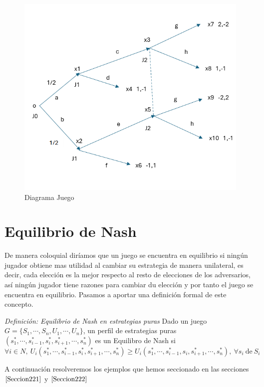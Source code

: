 \documentclass[12pt,a4paper,]{book}
\numberwithin{dummy}{section}
\theoremstyle{ocrenumbox}
\theoremstyle{blacknumex}
\theoremstyle{blacknumbox}
\theoremstyle{ocrenum}
\theoremstyle{ocrenum}
\begin{document}
\begin{figure}[H]

{\centering \includegraphics[width=0.8\linewidth]{forma_extensiva_rigurosa} 

}

\caption{\label{forma_extensiva_rigurosa}Diagrama Juego}\label{fig:forma_extensiva_rigurosa}
\end{figure}

\hypertarget{Seccion23}{%
\section{Equilibrio de Nash}\label{Seccion23}}

De manera coloquial diríamos que un juego se encuentra en equilibrio si
ningún jugador obtiene mas utilidad al cambiar su estrategia de manera
unilateral, es decir, cada elección es la mejor respecto al resto de
elecciones de los adversarios, así ningún jugador tiene razones para
cambiar du elección y por tanto el juego se encuentra en equilibrio.
Pasamos a aportar una definición formal de este concepto.

\emph{Definición: Equilibrio de Nash en estrategias puras} Dado un juego
\(G=\{S_1,\cdots,S_n,U_1,\cdots,U_n\}\), un perfil de estrategias puras
\((s_1^*,\cdots,s_{i-1}^*,s_i^*,s_{i+1}^*,\cdots,s_n^*)\) es un
Equilibro de Nash si \[
\forall i \in N, \ U_i(s_1^*,\cdots,s_{i-1}^*,s_i^*,s_{i+1}^*,\cdots,s_n^*) \geq U_i(s_1^*,\cdots,s_{i-1}^*,s_i,s_{i+1}^*,\cdots,s_n^*), \ \forall s_i \ \text{de} \ S_i
\]

A continuación resolveremos los ejemplos que hemos seccionado en las
secciones \(\ref{Seccion221}\) y \(\ref{Seccion222}\)
\end{document}
